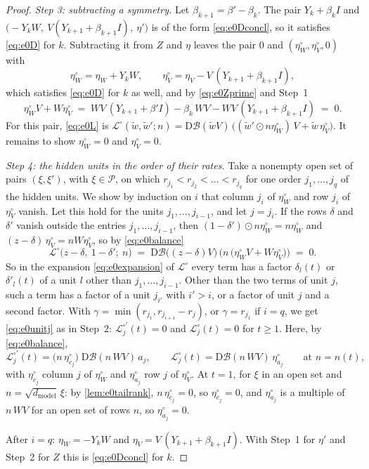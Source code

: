 \documentclass[10pt]{article}
\theoremstyle{definition}
\theoremstyle{remark}
\newcommand{\dm}{d_{\mathrm{model}}}
\newcommand{\Der}{\mathrm{D}}
\begin{document}
\begin{proof}
\emph{Step 3: subtracting a symmetry.} Let $\beta_{k+1} = \beta' - \beta_k$. The pair $Y_k + \beta_kI$ and $\big(-Y_kW,\ V(Y_{k+1} + \beta_{k+1}I),\ \eta'\big)$ is of the form \eqref{eq:e0Dconcl}, so it satisfies \eqref{eq:e0D} for $k$. Subtracting it from $Z$ and $\eta$ leaves the pair $0$ and $(\eta^\circ_W, \eta^\circ_V, 0)$ with
\[
\eta^\circ_W = \eta_W + Y_kW, \qquad \eta^\circ_V = \eta_V - V\,(Y_{k+1} + \beta_{k+1}I),
\]
which satisfies \eqref{eq:e0D} for $k$ as well, and by \eqref{eq:e0Zprime} and Step~1
\begin{equation}\label{eq:e0balance}
\eta^\circ_WV + W\eta^\circ_V \;=\; WV\,(Y_{k+1} + \beta'I) - \beta_k\,WV - WV\,(Y_{k+1} + \beta_{k+1}I) \;=\; 0 .
\end{equation}
For this pair, \eqref{eq:e0L} is $\mathcal L^\circ(\tilde w, \tilde w'; n) = \Der\mathcal B(\tilde wV)\,\big((\tilde w'\odot n\eta^\circ_W)\,V + \tilde w\,\eta^\circ_V\big)$. It remains to show $\eta^\circ_W = 0$ and $\eta^\circ_V = 0$.

\emph{Step 4: the hidden units in the order of their rates.} Take a nonempty open set of pairs $(\xi, \xi')$, with $\xi \in \mathcal P$, on which $r_{j_1} < r_{j_2} < \dots < r_{j_q}$ for one order $j_1, \dots, j_q$ of the hidden units. We show by induction on $i$ that column $j_i$ of $\eta^\circ_W$ and row $j_i$ of $\eta^\circ_V$ vanish. Let this hold for the units $j_1, \dots, j_{i-1}$, and let $j = j_i$. If the rows $\delta$ and $\delta'$ vanish outside the entries $j_1, \dots, j_{i-1}$, then $(1 - \delta')\odot n\eta^\circ_W = n\eta^\circ_W$ and $(z - \delta)\,\eta^\circ_V = nW\eta^\circ_V$, so by \eqref{eq:e0balance}
\[
\mathcal L^\circ\big(z - \delta,\ 1 - \delta';\ n\big) \;=\; \Der\mathcal B\big((z - \delta)V\big)\,\Big(n\,\big(\eta^\circ_WV + W\eta^\circ_V\big)\Big) \;=\; 0 .
\]
So in the expansion \eqref{eq:e0expansion} of $\mathcal L^\circ$ every term has a factor $\delta_l(t)$ or $\delta'_l(t)$ of a unit $l$ other than $j_1, \dots, j_{i-1}$. Other than the two terms of unit $j$, such a term has a factor of a unit $j_{i'}$ with $i' > i$, or a factor of unit $j$ and a second factor. With $\gamma = \min(r_{j_1}, r_{j_{i+1}} - r_j)$, or $\gamma = r_{j_1}$ if $i = q$, we get \eqref{eq:e0unitj} as in Step~2: $\mathcal L^{\circ\prime}_j(t) = 0$ and $\mathcal L^\circ_j(t) = 0$ for $t \ge 1$. Here, by \eqref{eq:e0balance},
\[
\mathcal L^{\circ\prime}_j(t) = \big(n\,\eta^\circ_{c_j}\big)\;\Der\mathcal B(n\,WV)\,a_j, \qquad \mathcal L^\circ_j(t) = \Der\mathcal B(n\,WV)\,\eta^\circ_{a_j} \qquad\text{at } n = n(t),
\]
with $\eta^\circ_{c_j}$ column $j$ of $\eta^\circ_W$ and $\eta^\circ_{a_j}$ row $j$ of $\eta^\circ_V$. At $t = 1$, for $\xi$ in an open set and $n = \sqrt{\dm}\,\xi$: by \cref{lem:e0tailrank}, $n\,\eta^\circ_{c_j} = 0$, so $\eta^\circ_{c_j} = 0$, and $\eta^\circ_{a_j}$ is a multiple of $n\,WV$ for an open set of rows $n$, so $\eta^\circ_{a_j} = 0$.

After $i = q$: $\eta_W = -Y_kW$ and $\eta_V = V\,(Y_{k+1} + \beta_{k+1}I)$. With Step~1 for $\eta'$ and Step~2 for $Z$ this is \eqref{eq:e0Dconcl} for $k$.
\end{proof}
\end{document}
